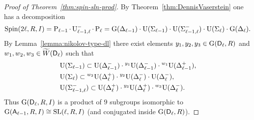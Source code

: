 \begin{proof}[Proof of Theorem~\ref{thm:spin-sln-prod}]
By Theorem~\ref{thm:DennisVaserstein} one has a decomposition
\[ \operatorname{Spin}(2\ell,R,I) = \operatorname{P}_{\ell-1}\cdot\operatorname{U}_{\ell-1,\ell}^-\cdot\operatorname{P}_{\ell} = \operatorname{G}(\Delta_{\ell-1})\cdot\operatorname{U}(\Sigma_{\ell-1})\cdot\operatorname{U}(\Sigma_{\ell-1,\ell}^-)\cdot\operatorname{U}(\Sigma_{\ell})\cdot\operatorname{G}(\Delta_\ell). \]
By Lemma~\ref{lemma:nikolov-type-dl} there exist elements $y_1,y_2,y_3\in\operatorname{G}(\mathsf{D}_\ell,R)$ and $w_1,w_2,w_3\in\widetilde{W}(\mathsf{D}_\ell)$ such that
\begin{align*}
& \operatorname{U}(\Sigma_{\ell-1}) \subset \operatorname{U}(\Delta_{\ell-1}^-) \cdot {}^{y_1}\!\operatorname{U}(\Delta_{\ell-1}^-) \cdot {}^{w_1}\!\operatorname{U}(\Delta_{\ell-1}^+), \\
& \operatorname{U}(\Sigma_\ell) \subset {}^{w_2}\!\operatorname{U}(\Delta_\ell^+) \cdot {}^{y_2}\!\operatorname{U}(\Delta_\ell^-) \cdot \operatorname{U}(\Delta_\ell^-), \\
& \operatorname{U}(\Sigma_{\ell-1,\ell}^-) \subset \operatorname{U}(\Delta_\ell^+) \cdot {}^{y_3}\!\operatorname{U}(\Delta_\ell^+) \cdot {}^{w_3}\!\operatorname{U}(\Delta_\ell^-).
\end{align*}
Thus $\operatorname{G}(\mathsf{D}_\ell,R,I)$ is a product of $9$ subgroups isomorphic to $\operatorname{G}(\mathsf{A}_{\ell-1},R,I)\cong\operatorname{SL}(\ell,R,I)$ (and conjugated inside $\operatorname{G}(\mathsf{D}_\ell,R)$).
\end{proof}